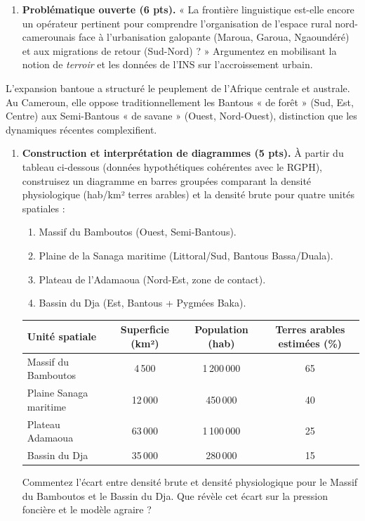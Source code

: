\documentclass[11pt]{article}
\begin{document}
\begin{exercice}
\begin{enumerate}
    \item \textbf{Problématique ouverte (6 pts).} « La frontière linguistique est-elle encore un opérateur pertinent pour comprendre l'organisation de l'espace rural nord-camerounais face à l'urbanisation galopante (Maroua, Garoua, Ngaoundéré) et aux migrations de retour (Sud-Nord) ? » Argumentez en mobilisant la notion de \textit{terroir} et les données de l'INS sur l'accroissement urbain.
\end{enumerate}
\end{exercice}

\begin{exercice}
L'expansion bantoue a structuré le peuplement de l'Afrique centrale et australe. Au Cameroun, elle oppose traditionnellement les Bantous « de forêt » (Sud, Est, Centre) aux Semi-Bantous « de savane » (Ouest, Nord-Ouest), distinction que les dynamiques récentes complexifient.

\begin{enumerate}
    \item \textbf{Construction et interprétation de diagrammes (5 pts).} À partir du tableau ci-dessous (données hypothétiques cohérentes avec le RGPH), construisez un diagramme en barres groupées comparant la densité physiologique (hab/km² terres arables) et la densité brute pour quatre unités spatiales : 
    \begin{enumerate}
        \item Massif du Bamboutos (Ouest, Semi-Bantous).
        \item Plaine de la Sanaga maritime (Littoral/Sud, Bantous Bassa/Duala).
        \item Plateau de l'Adamaoua (Nord-Est, zone de contact).
        \item Bassin du Dja (Est, Bantous + Pygmées Baka).
    \end{enumerate}
    \begin{center}
    \begin{tabular}{|l|c|c|c|}
    \hline
    \textbf{Unité spatiale} & \textbf{Superficie (km²)} & \textbf{Population (hab)} & \textbf{Terres arables estimées (\%)} \\
    \hline
    Massif du Bamboutos & 4\,500 & 1\,200\,000 & 65 \\
    Plaine Sanaga maritime & 12\,000 & 450\,000 & 40 \\
    Plateau Adamaoua & 63\,000 & 1\,100\,000 & 25 \\
    Bassin du Dja & 35\,000 & 280\,000 & 15 \\
    \hline
    \end{tabular}
    \end{center}
    Commentez l'écart entre densité brute et densité physiologique pour le Massif du Bamboutos et le Bassin du Dja. Que révèle cet écart sur la pression foncière et le modèle agraire ?


\end{enumerate}
\end{exercice}
\end{document}
